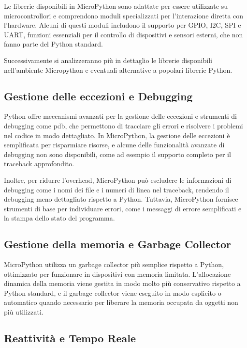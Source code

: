 \documentclass[12pt,a4paper]{report}
\begin{document}
Le librerie disponibili in MicroPython sono adattate per essere utilizzate su microcontrollori e comprendono moduli specializzati per l'interazione diretta con l'hardware. Alcuni di questi moduli includono il supporto per GPIO, I2C, SPI e UART, funzioni essenziali per il controllo di dispositivi e sensori esterni, che non fanno parte del Python standard.

Successivamente si analizzeranno più in dettaglio le librerie disponibili nell'ambiente Micropython e eventuali alternative a popolari librerie Python.

\subsection{Gestione delle eccezioni e Debugging}

Python offre meccanismi avanzati per la gestione delle eccezioni e strumenti di debugging come pdb, che permettono di tracciare gli errori e risolvere i problemi nel codice in modo dettagliato. In MicroPython, la gestione delle eccezioni è semplificata per risparmiare risorse, e alcune delle funzionalità avanzate di debugging non sono disponibili, come ad esempio il supporto completo per il traceback approfondito.

Inoltre, per ridurre l'overhead, MicroPython può escludere le informazioni di debugging come i nomi dei file e i numeri di linea nel traceback, rendendo il debugging meno dettagliato rispetto a Python. Tuttavia, MicroPython fornisce strumenti di base per individuare errori, come i messaggi di errore semplificati e la stampa dello stato del programma.

\subsection{Gestione della memoria e Garbage Collector}

MicroPython utilizza un garbage collector più semplice rispetto a Python, ottimizzato per funzionare in dispositivi con memoria limitata. L'allocazione dinamica della memoria viene gestita in modo molto più conservativo rispetto a Python standard, e il garbage collector viene eseguito in modo esplicito o automatico quando necessario per liberare la memoria occupata da oggetti non più utilizzati.

\subsection{Reattività e Tempo Reale}
\end{document}
